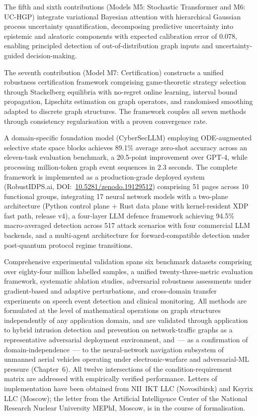 The fifth and sixth contributions (Models M5: Stochastic Transformer and M6: UC-HGP) integrate variational Bayesian attention with hierarchical Gaussian process uncertainty quantification, decomposing predictive uncertainty into epistemic and aleatoric components with expected calibration error of 0.078, enabling principled detection of out-of-distribution graph inputs and uncertainty-guided decision-making.

The seventh contribution (Model M7: Certification) constructs a unified robustness certification framework comprising game-theoretic strategy selection through Stackelberg equilibria with no-regret online learning, interval bound propagation, Lipschitz estimation on graph operators, and randomised smoothing adapted to discrete graph structures. The framework couples all seven methods through consistency regularisation with a proven convergence rate.

A domain-specific foundation model (CyberSecLLM) employing ODE-augmented selective state space blocks achieves 89.1\% average zero-shot accuracy across an eleven-task evaluation benchmark, a 20.5-point improvement over GPT-4, while processing million-token graph event sequences in 2.3 seconds. The complete framework is implemented as a production-grade deployed system (\textsf{RobustIDPS.ai}, DOI:~\url{10.5281/zenodo.19129512}) comprising 51 pages across 10 functional groups, integrating 17 neural network models with a two-plane architecture (Python control plane $+$ Rust data plane with kernel-resident XDP fast path, release v4), a four-layer LLM defence framework achieving 94.5\% macro-averaged detection across 517 attack scenarios with four commercial LLM backends, and a multi-agent architecture for forward-compatible detection under post-quantum protocol regime transitions.

Comprehensive experimental validation spans six benchmark datasets comprising over eighty-four million labelled samples, a unified twenty-three-metric evaluation framework, systematic ablation studies, adversarial robustness assessments under gradient-based and adaptive perturbations, and cross-domain transfer experiments on speech event detection and clinical monitoring. All methods are formulated at the level of mathematical operations on graph structures independently of any application domain, and are validated through application to hybrid intrusion detection and prevention on network-traffic graphs as a representative adversarial deployment environment, and~--- as a confirmation of domain-independence~--- to the neural-network navigation subsystem of unmanned aerial vehicles operating under electronic-warfare and adversarial-ML pressure (Chapter~6). All twelve intersections of the condition-requirement matrix are addressed with empirically verified performance. Letters of implementation have been obtained from NII~IKT LLC (Novosibirsk) and Ksyrix LLC (Moscow); the letter from the Artificial Intelligence Center of the National Research Nuclear University MEPhI, Moscow, is in the course of formalisation.

